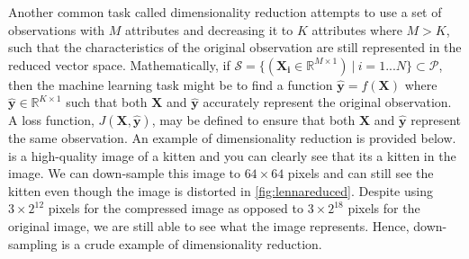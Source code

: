 Another common task called dimensionality reduction attempts to use a set of observations with $M$ attributes and decreasing it to $K$ attributes where $M > K$, such that the characteristics of the original observation are still represented in the reduced vector space.  Mathematically, if $\mathcal{S} =\{ ( \mathbf{X_i} \in \mathbb{R}^{M\times1} ) \ | \ i = 1...N\} \subset \mathcal{P}$, then the machine learning task might be to find a function $\mathbf{\hat{y}} = f(\mathbf{X})$ where $\mathbf{\hat{y}} \in \mathbb{R}^{K \times 1}$ such that both $\mathbf{X}$ and $\mathbf{\hat{y}}$ accurately represent the original observation. A loss function, $J(\mathbf{X}, \mathbf{\hat{y}})$, may be defined to ensure that both $\mathbf{X}$ and $\mathbf{\hat{y}}$ represent the same observation. An example of dimensionality reduction is provided below.  is a high-quality image of a kitten and you can clearly see that its a kitten in the image. We can down-sample this image to $64\times64$ pixels and can still see the kitten even though the image is distorted in \cref{fig:lennareduced}. Despite using $3 \times 2^{12}$ pixels for the compressed image as opposed to $3 \times 2^{18}$ pixels for the original image, we are still able to see what the image represents. Hence, down-sampling is a crude example of dimensionality reduction. 

